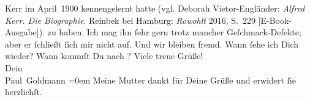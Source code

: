 \begin{ledgroupsized}[t]{13cm}
{{{                     Kerr im April 1900 kennengelernt hatte (vgl.
                     Deborah Vietor-Engländer: \emph{Alfred Kerr. Die
                        Biographie}. Reinbek bei Hamburg:
                        \emph{Rowohlt}{ }2016, S. 229 [E-Book-Ausgabe]).}}}\label{K_L02911-9h} zu
               haben. Ich mag ihn ſehr gern trotz mancher Geſchmack-Defekte; aber er ſchließt ſich
               mir nicht auf. {\pb}Und wir bleiben fremd.\pend
           \pstart
           Wann ſehe ich Dich wieder? Wann kommſt Du nach \label{K_L02911-10v}\label{K_L02911-10h}?\pend
           \pstart
           Viele treue Grüße! {\\[\baselineskip]}Dein {\\[\baselineskip]}\spacefill\mbox{Paul Goldmann}\pend
           \leftskip=0em{}\pstart
           \noindent{}Meine Mutter dankt für
                  Deine Grüße und erwidert ſie herzlichſt.\pend
           
         
         \endnumbering{}\end{ledgroupsized}  \newcommand{\dateiname}{L02911}\newcommand{\titel}{Paul Goldmann an Arthur Schnitzler, 18. 4. [1900]}\newcommand{\editorInnen}{Martin Anton Müller und Laura Untner}
      